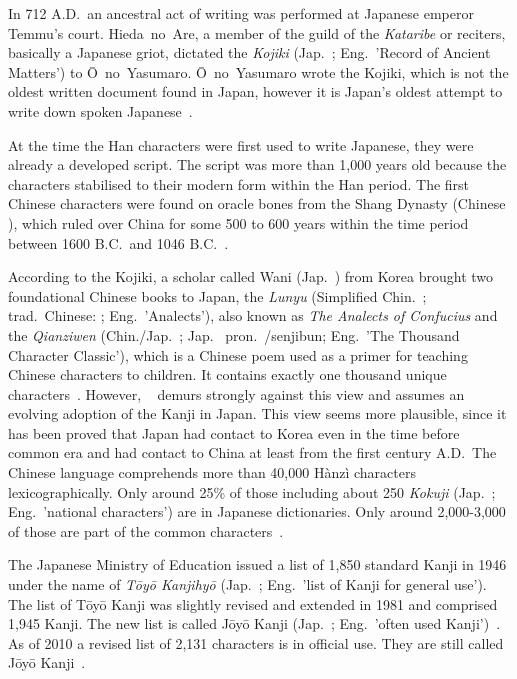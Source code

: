 In 712 A.D.~an ancestral act of writing was performed at 
Japanese emperor Temmu's court. Hieda~no~Are, a member of the guild of the 
\emph{Kataribe} or reciters, basically a Japanese griot, dictated the 
\emph{Kojiki} (Jap.~; Eng.~'Record of Ancient Matters') to 
Ō~no~Yasumaro. Ō~no~Yasumaro wrote the Kojiki, which is not the oldest written 
document found in Japan, however it is Japan's oldest attempt to write down 
spoken Japanese~.

At the time the Han characters were first used to write Japanese, 
they were already a developed script. The script was more than 1,000 years old
because the characters stabilised to their modern form within the Han 
period. %
The first Chinese characters were found on oracle bones from the Shang Dynasty
(Chinese ), which ruled over China for some 500 to 600 years within 
the time period between 1600 B.C.~and 1046 
B.C.~.

According to the Kojiki, a scholar called Wani (Jap.~) from Korea 
brought two foundational Chinese books to Japan, the \emph{Lunyu} 
(Simplified Chin.~; trad.~Chinese: ; Eng.~'Analects'), 
also known as \emph{The Analects of Confucius} and 
the \emph{Qianziwen} (Chin./Jap.~; Jap.~
pron.~/senjibun; Eng.~'The Thousand Character Classic'),
which is a Chinese poem used as a primer for teaching Chinese characters to 
children. It contains exactly one thousand unique 
characters~. However, 
~\citeyear{Lange1922} demurs strongly against this view 
and assumes an evolving adoption of the Kanji in
Japan. This view seems more plausible, since it has been proved that Japan 
had contact to Korea even in the time before common era and had contact to 
China at least from the first century A.D.~The Chinese language comprehends more
than 40,000 Hànzì characters lexicographically. Only around 25\% of those 
including about 250 \emph{Kokuji} (Jap.~; Eng.~'national characters') 
are in Japanese dictionaries. Only around 2,000-3,000 of those are part of the 
common characters~. 

The Japanese Ministry of Education issued a list of 1,850 standard Kanji in 1946
under the name of \emph{Tōyō Kanjihyō} (Jap.~;
Eng.~'list of Kanji for general use'). The list of Tōyō Kanji was slightly 
revised and extended in 1981 and comprised 1,945 Kanji. The new list is 
called Jōyō Kanji
(Jap.~; Eng.~'often used Kanji')~.
As of 2010 a revised list of 2,131 characters is in official 
use. They are still called Jōyō Kanji~. 


